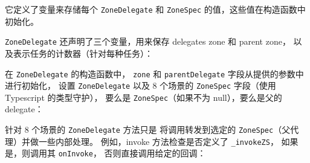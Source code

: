 它定义了变量来存储每个 \texttt{ZoneDelegate} 和 \texttt{ZoneSpec} 的值，这些值在构造函数中初始化。




\texttt{ZoneDelegate} 还声明了三个变量，用来保存 delegates zone 和 parent zone，
以及表示任务的计数器（针对每种任务）：




在 \texttt{ZoneDelegate} 的构造函数中，
\texttt{zone} 和 \texttt{parentDelegate} 字段从提供的参数中进行初始化，
设置 \texttt{ZoneDelegate} 以及 8 个场景的 \texttt{ZoneSpec} 字段（使用 Typescript 的类型守护），
要么是 \texttt{ZoneSpec}（如果不为 null），要么是父的 delegate：




针对 8 个场景的 \texttt{ZoneDelegate} 方法只是
将调用转发到选定的 \texttt{ZoneSpec}（父代理）并做一些内部处理。
例如，invoke 方法检查是否定义了 \texttt{\_invokeZS}，
如果是，则调用其 \texttt{onInvoke}，
否则直接调用给定的回调：




